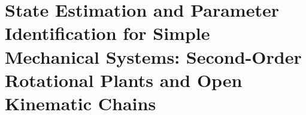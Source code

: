 \chapter{State Estimation and Parameter Identification
             for Simple Mechanical Systems:
             Second-Order Rotational Plants
             and Open Kinematic Chains}
\label{chSMS_ID}

\acresetall








